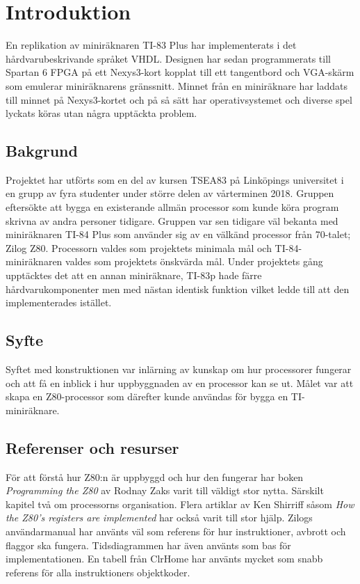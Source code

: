 \documentclass[main.tex]{subfiles}
\begin{document}
\section{Introduktion}
En replikation av miniräknaren TI-83 Plus har implementerats i det
hårdvarubeskrivande språket VHDL. Designen har sedan programmerats till Spartan
6 FPGA på ett Nexys3-kort kopplat till ett tangentbord och VGA-skärm som
emulerar miniräknarens gränssnitt. Minnet från en miniräknare har laddats till
minnet på Nexys3-kortet och på så sätt har operativsystemet och diverse spel
lyckats köras utan några upptäckta problem.

\subsection{Bakgrund}
Projektet har utförts som en del av kursen TSEA83 på Linköpings universitet i
en grupp av fyra studenter under större delen av vårterminen 2018. Gruppen
eftersökte att bygga en existerande allmän processor som kunde köra program
skrivna av andra personer tidigare. Gruppen var sen tidigare väl bekanta med
miniräknaren TI-84 Plus som använder sig av en välkänd processor från 70-talet;
Zilog Z80. Processorn valdes som projektets minimala mål och TI-84-miniräknaren
valdes som projektets önskvärda mål. Under projektets gång upptäcktes det att
en annan miniräknare, TI-83p hade färre hårdvarukomponenter men med nästan
identisk funktion vilket ledde till att den implementerades istället.

\subsection{Syfte}
Syftet med konstruktionen var inlärning av kunskap om hur processorer fungerar
och att få en inblick i hur uppbyggnaden av en processor kan se ut. Målet var
att skapa en Z80-processor som därefter kunde användas för bygga en
TI-miniräknare.

\subsection{Referenser och resurser}
För att förstå hur Z80:n är uppbyggd och hur den fungerar har boken {\it
Programming the Z80}\cite{zaks-z80prog} av Rodnay Zaks varit till väldigt stor
nytta. Särskilt kapitel två om processorns organisation. Flera artiklar av Ken
Shirriff såsom {\it How the Z80's registers are implemented}\cite{shirriff-reg}
har också varit till stor hjälp. Zilogs användarmanual\cite{z80um} har använts
väl som referens för hur instruktioner, avbrott och flaggor ska fungera.
Tidsdiagrammen har även använts som bas för implementationen. En tabell från
ClrHome\cite{clrhome} har använts mycket som snabb referens för alla
instruktioners objektkoder.
\end{document}
